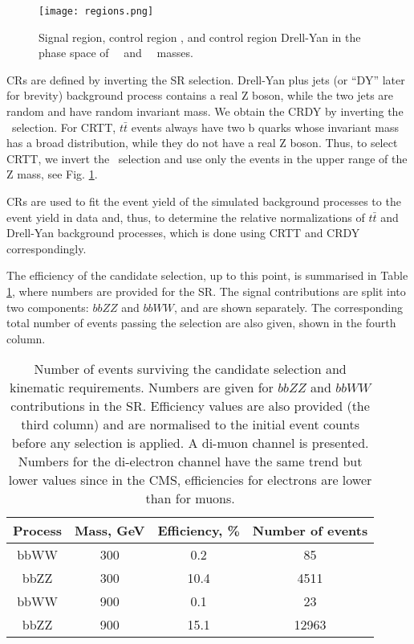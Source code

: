 \begin{figure}[!htb]%
\begin{center}
\texttt{[image: regions.png]}
\caption[Analysis phase space with the signal and two control regions.]{ Signal region, control region \ttbar, and control region Drell-Yan in the phase space of \ZtoLL \ ~and ~\HBB ~masses. }
\label{fig:regions}
\end{center}
\end{figure}

CRs are defined by inverting the SR selection. Drell-Yan plus jets (or ``DY'' later for brevity) background process contains a real Z boson, while the two jets are random and have random invariant mass. We obtain the CRDY by inverting the \HBB~selection. For CRTT, $t\bar{t}$ events always have two b quarks whose invariant mass has a broad distribution, while they do not have a real Z boson. Thus, to select CRTT, we invert the \Zll~selection and use only the events in the upper range of the Z mass, see Fig. \ref{fig:regions}. 

CRs are used to fit the event yield of the simulated background processes to the event yield in data and, thus, to determine the relative normalizations of $t\bar{t}$ and Drell-Yan background processes, which is done using CRTT and CRDY correspondingly. 

The efficiency of the candidate selection, up to this point, is summarised in Table \ref{eff_upto_bdt}, where numbers are provided for the SR. The signal contributions are split into two components: $bbZZ$ and $bbWW$, and are shown separately. The corresponding total number of events passing the selection are also given, shown in the fourth column.

\begin{table}
\begin{center}
\caption{Number of events surviving the candidate selection and kinematic requirements. Numbers are given for $bbZZ$ and $bbWW$ contributions in the SR. Efficiency values are also provided (the third column) and are normalised to the initial event counts before any selection is applied. A di-muon channel is presented. Numbers for the di-electron channel have the same trend but lower values since in the CMS, efficiencies for electrons are lower than for muons. }
\begin{tabular}{ |c|c|c|c| } \hline
{Process} & Mass, GeV & Efficiency, \% & Number of events \\\hline
bbWW & 300 & 0.2 & 85\\
bbZZ & 300 & 10.4 & 4511\\
bbWW & 900 & 0.1 & 23\\
bbZZ & 900 & 15.1 & 12963\\\hline
\end{tabular}
\label{eff_upto_bdt}
\end{center}
\end{table}

